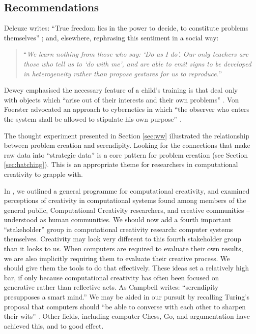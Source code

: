\subsection{Recommendations} \label{sec:recommendations}

%
Deleuze writes: ``True freedom lies in the power to decide, to
constitute problems themselves'' \cite[p. 15]{deleuze1991bergsonism};
and, elsewhere, rephrasing this sentiment in a social way:
\begin{quote}
``\emph{We learn nothing from those who say: `Do as I do'. Our only teachers
  are those who tell us to `do with me', and are able to emit signs to
  be developed in heterogeneity rather than propose gestures for us to
  reproduce.}''~\cite[p. 26]{deleuze1994difference}
\end{quote}
Dewey emphasised the necessary feature of a child's training is that
deal only with objects which ``arise out of their interests and their
own problems'' \cite[p. 73]{dewey-by-mead}.  Von Foerster advocated an
approach to cybernetics in which ``the observer who enters the system
shall be allowed to stipulate his own purpose''
\cite[p. 286]{von2003essays}.

The thought experiment presented in Section \ref{sec:ww} illustrated
the relationship between problem creation and serendipity.  Looking
for the connections that make raw data into ``strategic data'' is a
core pattern for problem creation (see Section \ref{sec:hatching}).
This is an appropriate theme for researchers in computational
creativity to grapple with.

In \cite{stakeholder-groups-bookchapter}, we outlined a general
programme for computational creativity, and examined perceptions of
creativity in computational systems found among members of the general
public, Computational Creativity researchers, and creative communities
-- understood as human communities.  We should now add a fourth
important ``stakeholder'' group in computational creativity research:
computer systems themselves.  Creativity may look very different to
this fourth stakeholder group than it looks to us.  When computers are
required to evaluate their own results, we are also implicitly
requiring them to evaluate their creative process.  We should give
them the tools to do that effectively.
%
These ideas set a relatively high bar, if only because computational
creativity has often been focused on generative rather than reflective
acts.  As Campbell \citeyear{campbell} writes: ``serendipity
presupposes a smart mind.''  We may be aided in our pursuit by
recalling Turing's proposal that computers should ``be able to
converse with each other to sharpen their wits''
\cite{turing-intelligent}.  Other fields, including computer Chess,
Go, and argumentation have achieved this, and to good effect.

